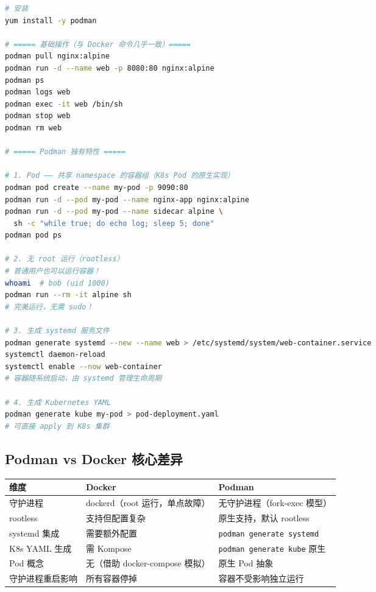 \documentclass[12pt,UTF8]{ctexbook}
\begin{document}
\begin{lstlisting}[language=bash]
# 安装
yum install -y podman

# ===== 基础操作（与 Docker 命令几乎一致）=====
podman pull nginx:alpine
podman run -d --name web -p 8080:80 nginx:alpine
podman ps
podman logs web
podman exec -it web /bin/sh
podman stop web
podman rm web

# ===== Podman 独有特性 =====

# 1. Pod —— 共享 namespace 的容器组（K8s Pod 的原生实现）
podman pod create --name my-pod -p 9090:80
podman run -d --pod my-pod --name nginx-app nginx:alpine
podman run -d --pod my-pod --name sidecar alpine \
  sh -c "while true; do echo log; sleep 5; done"
podman pod ps

# 2. 无 root 运行（rootless）
# 普通用户也可以运行容器！
whoami  # bob (uid 1000)
podman run --rm -it alpine sh
# 完美运行，无需 sudo！

# 3. 生成 systemd 服务文件
podman generate systemd --new --name web > /etc/systemd/system/web-container.service
systemctl daemon-reload
systemctl enable --now web-container
# 容器随系统启动，由 systemd 管理生命周期

# 4. 生成 Kubernetes YAML
podman generate kube my-pod > pod-deployment.yaml
# 可直接 apply 到 K8s 集群
\end{lstlisting}

\subsection{Podman vs Docker 核心差异}

\begin{tabular}{|p{3.5cm}|p{4cm}|p{4.5cm}|}
\hline
\textbf{维度} & \textbf{Docker} & \textbf{Podman} \\
\hline
守护进程 & dockerd（root 运行，单点故障） & 无守护进程（fork-exec 模型） \\
\hline
rootless & 支持但配置复杂 & 原生支持，默认 rootless \\
\hline
systemd 集成 & 需要额外配置 & \texttt{podman generate systemd} \\
\hline
K8s YAML 生成 & 需 Kompose & \texttt{podman generate kube} 原生 \\
\hline
Pod 概念 & 无（借助 docker-compose 模拟） & 原生 Pod 抽象 \\
\hline
守护进程重启影响 & 所有容器停掉 & 容器不受影响独立运行 \\
\hline
\end{tabular}
\end{document}

